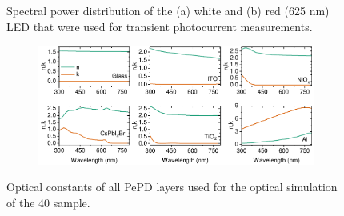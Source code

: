 \begin{figure}[ht!]
    \caption[Spectral power distribution of the white and red (625 nm) LED that were used for transient photocurrent measurements.]{Spectral power distribution of the (a) white and (b) red (625 nm) LED that were used for transient photocurrent measurements.}
    \label{fig:etl_opt:tpc_sources}
\end{figure}



\begin{figure}[htbp]
    \centering
    \begin{subfigure}[t]{0.99\textwidth}
        \centering
        \includegraphics[width=\textwidth]{chapters/transport_layers/images/nk_transfer_matrix.pdf} %
                
    \end{subfigure}
    \caption[Optical constants of all PePD layers used for the optical simulation of the 40 sample.]{Optical constants of all PePD layers used for the optical simulation of the 40 sample.}
    \label{fig:tetl_opt:nk_transfer_materix}
\end{figure}

